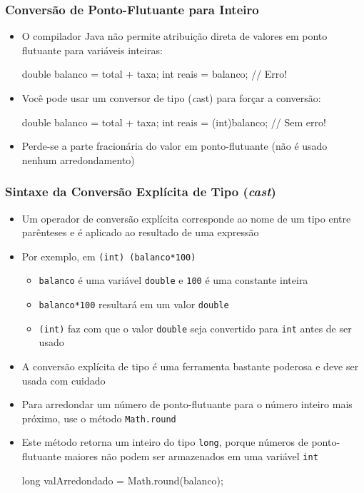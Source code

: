 \documentclass[xcolor={dvipsnames,table},aspectratio=169]{beamer}
\begin{document}
\begin{frame}[fragile]\frametitle{Conversão de Ponto-Flutuante para Inteiro}
\begin{itemize}
	\item O compilador Java não permite atribuição direta de valores em ponto flutuante para variáveis inteiras:
\begin{javacode}
double balanco = total + taxa;
int reais = balanco; // Erro!
\end{javacode}
	\item Você pode usar um conversor de tipo (\emph cast) para forçar a conversão:
\begin{javacode}
double balanco = total + taxa;
int reais = (int)balanco; // Sem erro!
\end{javacode}
	\item Perde-se a parte fracionária do valor em ponto-flutuante (não é usado nenhum arredondamento)
\end{itemize}
\end{frame}

\begin{frame}[fragile]\frametitle{Sintaxe da Conversão Explícita de Tipo (\emph{cast})}
\begin{itemize}
	\item Um operador de conversão explícita corresponde ao nome de um tipo entre parênteses e é aplicado ao resultado de uma expressão
	\item Por exemplo, em \texttt{(int) (balanco*100)}
	\begin{itemize}
		\item \texttt{balanco} é uma variável \texttt{double} e \texttt{100} é uma constante inteira
		\item \texttt{balanco*100} resultará em um valor \texttt{double}
		\item \texttt{(int)} faz com que o valor \texttt{double} seja convertido para \texttt{int} antes de ser usado
	\end{itemize}
	\item A conversão explícita de tipo é uma ferramenta bastante poderosa e deve ser usada com cuidado
	\item Para arredondar um número de ponto-flutuante para o número inteiro mais próximo, use o método \texttt{Math.round}
	\item Este método retorna um inteiro do tipo \texttt{long}, porque números de ponto-flutuante maiores não podem ser armazenados em uma variável \texttt{int}
\begin{javacode}
long valArredondado = Math.round(balanco);
\end{javacode}
\end{itemize}
\end{frame}
\end{document}
